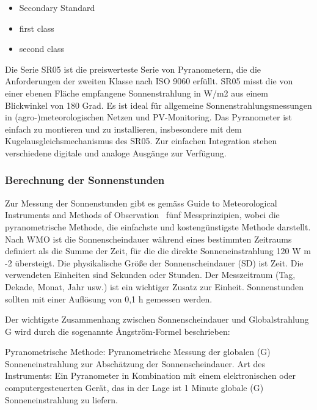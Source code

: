 \begin{itemize}  
\item Secondary Standard
\item first class
\item second class 
\end{itemize}


Die Serie SR05 ist die preiswerteste Serie von Pyranometern, die die Anforderungen der zweiten Klasse nach ISO 9060 erfüllt. SR05 misst die von einer ebenen Fläche empfangene Sonnenstrahlung in W/m2 aus einem Blickwinkel von 180 Grad. Es ist ideal für allgemeine Sonnenstrahlungsmessungen in (agro-)meteorologischen Netzen und PV-Monitoring. Das Pyranometer ist einfach zu montieren und zu installieren, insbesondere mit dem Kugelausgleichsmechanismus des SR05. Zur einfachen Integration stehen verschiedene digitale und analoge Ausgänge zur Verfügung.


\subsubsection{Berechnung der Sonnenstunden}
Zur Messung der Sonnenstunden gibt es gemäss  \flqq Guide to Meteorological Instruments and Methods of Observation\frqq ~\cite{WMO2014Gtmi}  fünf Messprinzipien, wobei die pyranometrische Methode, die einfachste und kostengünstigste Methode darstellt. Nach WMO ist die Sonnenscheindauer während eines bestimmten Zeitraums definiert als die Summe der Zeit, für die die direkte Sonneneinstrahlung 120 W m -2 übersteigt. Die physikalische Größe der Sonnenscheindauer (SD) ist Zeit. Die verwendeten Einheiten sind Sekunden oder Stunden. Der Messzeitraum (Tag, Dekade, Monat, Jahr usw.) ist ein wichtiger Zusatz zur Einheit. Sonnenstunden sollten mit einer Auflösung von 0,1 h gemessen werden.

Der wichtigste Zusammenhang zwischen Sonnenscheindauer und Globalstrahlung G wird durch die sogenannte Ångström-Formel beschrieben:

Pyranometrische Methode: Pyranometrische Messung der globalen (G) Sonneneinstrahlung zur Abschätzung der Sonnenscheindauer. Art des Instruments: Ein Pyranometer in Kombination mit einem elektronischen oder computergesteuerten Gerät, das in der Lage ist 1 Minute globale (G) Sonneneinstrahlung zu liefern.

